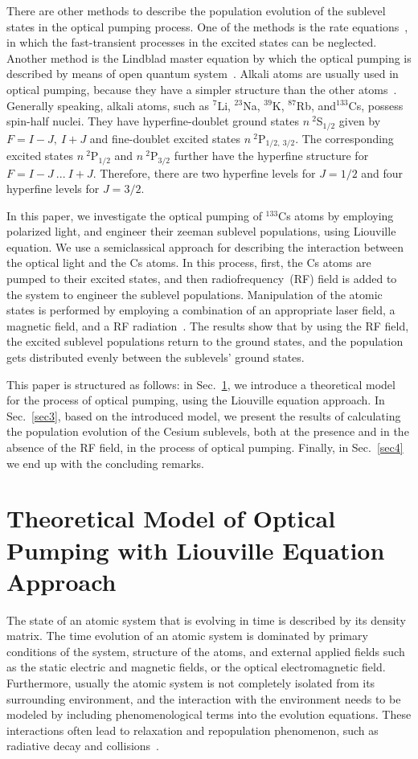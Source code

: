\documentclass[a4paper]{article}
\begin{document}
There are other methods to describe the population evolution of the sublevel states in the optical pumping process. One of the methods is the rate equations~\cite{r6}, in which the fast-transient processes in the excited states can be neglected. Another method is the Lindblad master equation by which the optical pumping is described by means of open quantum system~\cite{r7}. Alkali atoms are usually used in optical pumping, because they have a simpler structure than the other atoms~\cite{r8,r9,r10,r11,r12,r13}. Generally speaking, alkali atoms, such as $^{7}$Li, $^{23}$Na, $^{39}$K, $^{87}$Rb, and$^{133}$Cs, possess spin-half nuclei. They have hyperfine-doublet ground states $n\   ^{2}$S$_{1/2}$ given by $F=I-J,\ I+J$ and fine-doublet excited states $n\   ^{2}$P$_{1/2,\ 3/2}$.
The corresponding excited states $n\   ^{2}$P$_{1/2}$ and $n\   ^{2}$P$_{3/2}$ further have the hyperfine
structure for $F= I-J\  ...\  I+J$. Therefore, there are two hyperfine levels for $J=1/2$ and four hyperfine levels  for $J=3/2$. 

In this paper, we investigate the optical pumping of $^{133}$Cs atoms by employing polarized light, and engineer their zeeman sublevel populations, using Liouville equation. We use a semiclassical approach for describing the interaction between the optical light and the Cs atoms. In this process, first, the Cs atoms are pumped to their excited states, and then radiofrequency~(RF) field is added to the system to engineer the sublevel populations. Manipulation of the atomic states is performed by employing a combination of an appropriate laser field, a magnetic field, and a RF radiation~\cite{r18,r16,r15,r14,r17}. The results show that by using the RF field, the excited sublevel populations return to the ground states,  and the population gets distributed evenly between the sublevels' ground states. 

This paper is structured as follows: in Sec.~\ref{sec2}, we introduce a theoretical model for the process of optical pumping, using the Liouville equation approach. In Sec.~\ref{sec3}, based on the introduced model, we present the results of calculating the population evolution of the Cesium sublevels, both at the presence and in the absence of the RF field, in the process of optical pumping. Finally, in Sec.~\ref{sec4} we end up with the concluding remarks.

\section{Theoretical Model of Optical Pumping  with Liouville Equation Approach}\label{sec2}
The state of an atomic system that is evolving in time is described by its density matrix. The time evolution of an atomic system is dominated by primary conditions of the system, structure of the atoms, and external applied fields such as the static electric and magnetic fields, or the optical electromagnetic field. Furthermore, usually the atomic system is not completely isolated from its surrounding environment, and the interaction with the environment needs to be modeled by including phenomenological terms into the evolution equations. These interactions often lead to relaxation and repopulation phenomenon, such as radiative decay and collisions~\cite{r5,r19,r20}. 
\end{document}
